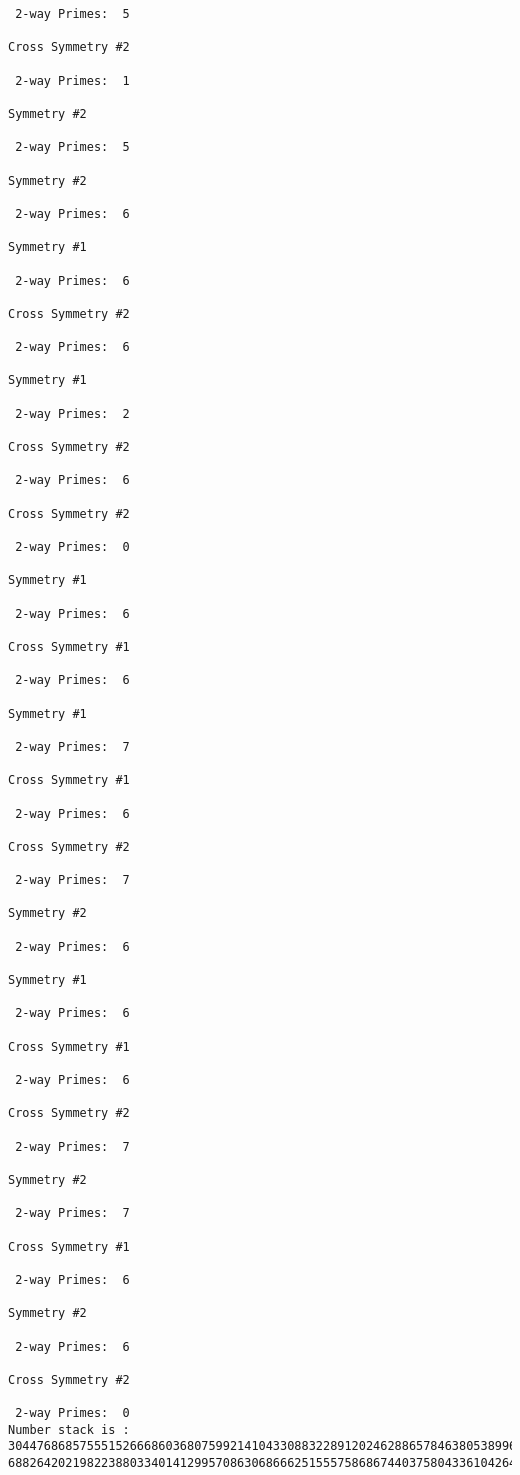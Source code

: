 \begin{verbatim}
 2-way Primes: 	5

Cross Symmetry #2

 2-way Primes: 	1

Symmetry #2

 2-way Primes: 	5

Symmetry #2

 2-way Primes: 	6

Symmetry #1

 2-way Primes: 	6

Cross Symmetry #2

 2-way Primes: 	6

Symmetry #1

 2-way Primes: 	2

Cross Symmetry #2

 2-way Primes: 	6

Cross Symmetry #2

 2-way Primes: 	0

Symmetry #1

 2-way Primes: 	6

Cross Symmetry #1

 2-way Primes: 	6

Symmetry #1

 2-way Primes: 	7

Cross Symmetry #1

 2-way Primes: 	6

Cross Symmetry #2

 2-way Primes: 	7

Symmetry #2

 2-way Primes: 	6

Symmetry #1

 2-way Primes: 	6

Cross Symmetry #1

 2-way Primes: 	6

Cross Symmetry #2

 2-way Primes: 	7

Symmetry #2

 2-way Primes: 	7

Cross Symmetry #1

 2-way Primes: 	6

Symmetry #2

 2-way Primes: 	6

Cross Symmetry #2

 2-way Primes: 	0
Number stack is :
30447686857555152666860368075992141043308832289120246288657846380538996794608835958544046240163340857
68826420219822388033401412995708630686662515557586867440375804336104264044585953880649769983508364875


\end{verbatim}
